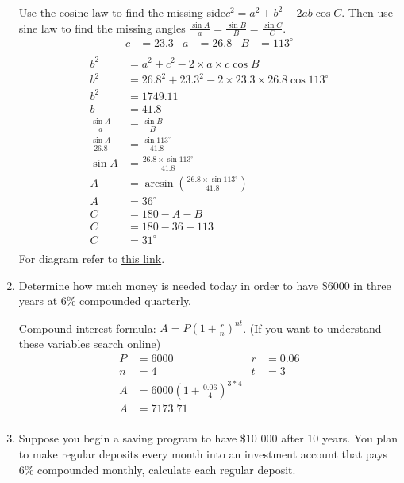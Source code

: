 \documentclass[paper=a4, fontsize=11pt]{scrartcl}
\begin{document}
\begin{enumerate}[resume]
    Use the cosine law to find the missing side$c^2=a^2+b^2-2ab\cos C$. Then use sine law to find the missing angles $\frac{\sin A}{a}=\frac{\sin B}{B}=\frac{\sin C}{C}$.
    \begin{align*}
        c&=23.3&a&=26.8&B&=113^\circ\\
    \end{align*}
    \begin{align*}
        b^2&=a^2+c^2-2\times a\times c\cos B\\
        b^2&=26.8^2+23.3^2-2\times23.3\times26.8\cos 113^\circ\\
        b^2&=1749.11\\
        b&=41.8\\
        \frac{\sin A}{a}&=\frac{\sin B}{B}\\
        \frac{\sin A}{26.8}&=\frac{\sin 113^\circ}{41.8}\\
        \sin A&=\frac{26.8\times\sin 113^\circ}{41.8}\\
        A&=\arcsin(\frac{26.8\times\sin 113^\circ}{41.8})\\
        A&=36^\circ\\
        C&=180-A-B\\
        C&=180-36-113\\
        C&=31^\circ\\
    \end{align*}
    For diagram refer to \href{https://www.triangle-calculator.com/?q=c%3D23.3+a%3D26.8+B%3D113&submit=Solve}{this link}.
    \item Determine how much money is needed today in order to have \$6000 in three years at 6\% compounded quarterly.
    
    Compound interest formula: $A=P(1+\frac{r}{n})^{nt}$. (If you want to understand these variables search online) 
    \begin{align*}
        P&=6000&r&=0.06\\
        n&=4&t&=3\\
        A&=6000(1+\frac{0.06}{4})^{3*4}\\
        A&=7173.71\\
    \end{align*}
    \item Suppose you begin a saving program to have \$10 000 after 10 years. You plan to make regular deposits every month into an investment account that pays 6\% compounded monthly, calculate each regular deposit.
    

\end{enumerate}
\end{document}
